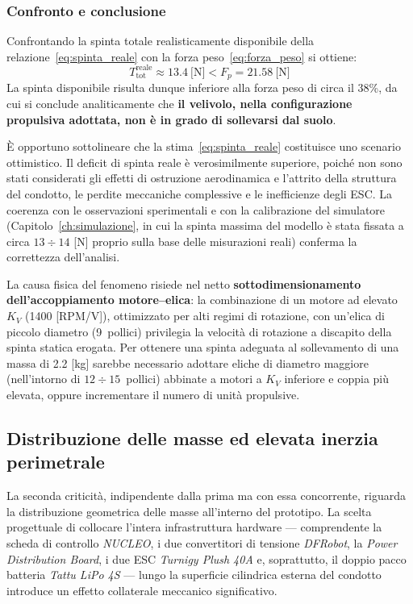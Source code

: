 \documentclass[11pt]{report}
\begin{document}
	\subsubsection*{Confronto e conclusione}
	Confrontando la spinta totale realisticamente disponibile della relazione~\eqref{eq:spinta_reale} con la forza peso~\eqref{eq:forza_peso} si ottiene:
	\begin{equation}
		T_\text{tot}^\text{reale} \approx 13.4\ \text{[N]} < F_p = 21.58\ \text{[N]}
		\label{eq:deficit}
	\end{equation}
	La spinta disponibile risulta dunque inferiore alla forza peso di circa il 38\%, da cui si conclude analiticamente che \textbf{il velivolo, nella configurazione propulsiva adottata, non è in grado di sollevarsi dal suolo}.
	
	È opportuno sottolineare che la stima~\eqref{eq:spinta_reale} costituisce uno scenario ottimistico. Il deficit di spinta reale è verosimilmente superiore, poiché non sono stati considerati gli effetti di ostruzione aerodinamica e l'attrito della struttura del condotto, le perdite meccaniche complessive e le inefficienze degli ESC. La coerenza con le osservazioni sperimentali e con la calibrazione del simulatore (Capitolo~\ref{ch:simulazione}, in cui la spinta massima del modello è stata fissata a circa $13 \div 14$ [N] proprio sulla base delle misurazioni reali) conferma la correttezza dell'analisi.
	
	La causa fisica del fenomeno risiede nel netto \textbf{sottodimensionamento dell'accoppiamento motore--elica}: la combinazione di un motore ad elevato $K_V$ (1400 [RPM/V]), ottimizzato per alti regimi di rotazione, con un'elica di piccolo diametro (9~pollici) privilegia la velocità di rotazione a discapito della spinta statica erogata. Per ottenere una spinta adeguata al sollevamento di una massa di 2.2 [kg] sarebbe necessario adottare eliche di diametro maggiore (nell'intorno di $12 \div 15$~pollici) abbinate a motori a $K_V$ inferiore e coppia più elevata, oppure incrementare il numero di unità propulsive.
	
	\subsection{Distribuzione delle masse ed elevata inerzia perimetrale}
	\label{sec:distribuzione_masse}
	La seconda criticità, indipendente dalla prima ma con essa concorrente, riguarda la distribuzione geometrica delle masse all'interno del prototipo. La scelta progettuale di collocare l'intera infrastruttura hardware --- comprendente la scheda di controllo \textit{NUCLEO}, i due convertitori di tensione \textit{DFRobot}, la \textit{Power Distribution Board}, i due ESC \textit{Turnigy Plush 40A} e, soprattutto, il doppio pacco batteria \textit{Tattu LiPo 4S} --- lungo la superficie cilindrica esterna del condotto introduce un effetto collaterale meccanico significativo.
	
\end{document}
